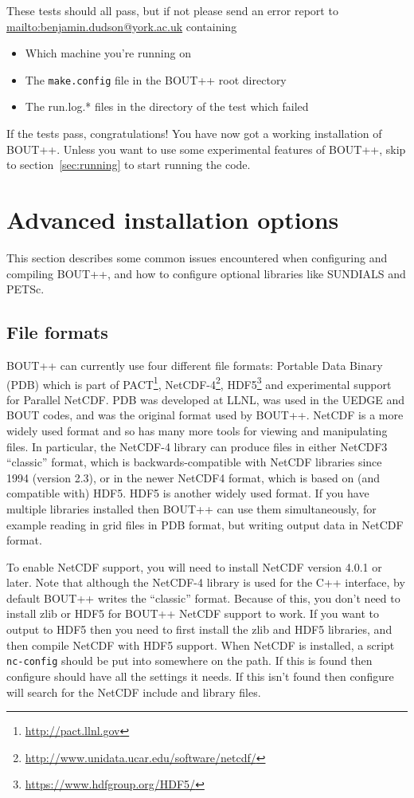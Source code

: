 \documentclass[12pt]{article}
\begin{document}
These tests should all pass, but if not please send an error report to
\url{mailto:benjamin.dudson@york.ac.uk} containing
%
\begin{itemize}
\item Which machine you're running on
\item The \texttt{make.config} file in the BOUT++ root directory
\item The run.log.* files in the directory of the test which failed
\end{itemize}
%
If the tests pass, congratulations! You have now got a working installation of
BOUT++.  Unless you want to use some experimental features of BOUT++, skip to
section~\ref{sec:running} to start running the code.





\section{Advanced installation options}
%
\label{sec:advancedinstall}
%
This section describes some common issues encountered when configuring and
compiling BOUT++, and how to configure optional libraries like SUNDIALS and
PETSc.



\subsection{File formats}
%
BOUT++ can currently use four different file formats: Portable Data Binary
(PDB) which is part of PACT\footnote{\url{http://pact.llnl.gov}},
NetCDF-4\footnote{\url{http://www.unidata.ucar.edu/software/netcdf/}},
HDF5\footnote{\url{https://www.hdfgroup.org/HDF5/}} and experimental support
for Parallel NetCDF.  PDB was developed at LLNL, was used in the UEDGE and BOUT
codes, and was the original format used by BOUT++. NetCDF is a more widely used
format and so has many more tools for viewing and manipulating files.  In
particular, the NetCDF-4 library can produce files in either NetCDF3
``classic'' format, which is backwards-compatible with NetCDF libraries since
1994 (version 2.3), or in the newer NetCDF4 format, which is based on (and
compatible with) HDF5. HDF5 is another widely used format. If you have multiple
libraries installed then BOUT++ can use them simultaneously, for example
reading in grid files in PDB format, but writing output data in NetCDF format.

To enable NetCDF support, you will need to install NetCDF version 4.0.1 or
later.  Note that although the NetCDF-4 library is used for the C++ interface,
by default BOUT++ writes the ``classic'' format. Because of this, you don't
need to install zlib or HDF5 for BOUT++ NetCDF support to work.  If you want to
output to HDF5 then you need to first install the zlib and HDF5 libraries, and
then compile NetCDF with HDF5 support.  When NetCDF is installed, a script
\texttt{nc-config} should be put into somewhere on the path. If this is found
then configure should have all the settings it needs. If this isn't found then
configure will search for the NetCDF include and library files.
\end{document}
